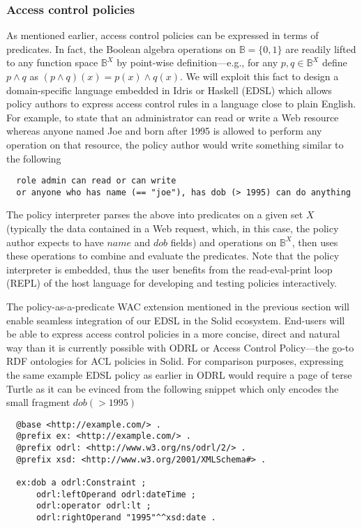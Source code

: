 \subsubsection{Access control policies}
As mentioned earlier, access control policies can be expressed in
terms of predicates. In fact, the Boolean algebra operations on
$\mathbb{B} = \{0,1\}$ are readily lifted to any function space
$\mathbb{B}^X$ by point-wise definition---e.g., for any $p,q \in \mathbb{B}^X$
define $p \wedge q$ as $(p \wedge q)(x) = p(x) \wedge q(x)$. We will
exploit this fact to design a domain-specific language embedded in
Idris or Haskell (EDSL\cite{gibbons2014folding}) which allows policy
authors to express access control rules in a language close to plain
English. For example, to state that an administrator can read or write
a Web resource whereas anyone named Joe and born after 1995 is allowed
to perform any operation on that resource, the policy author would
write something similar to the following
\begin{lstlisting}
  role admin can read or can write
  or anyone who has name (== "joe"), has dob (> 1995) can do anything
\end{lstlisting}
The policy interpreter parses the above into predicates on a given
set $X$ (typically the data contained in a Web request, which, in
this case, the policy author expects to have $name$ and $dob$ fields)
and operations on $\mathbb{B}^X$, then uses these operations to combine
and evaluate the predicates. Note that the policy interpreter is
embedded, thus the user benefits from the read-eval-print loop
(REPL) of the host language for developing and testing policies
interactively.

The policy-as-a-predicate WAC extension mentioned in the previous
section will enable seamless integration of our EDSL in the Solid
ecosystem. End-users will be able to express access control policies
in a more concise, direct and natural way than it is currently possible
with ODRL or Access Control Policy---the go-to RDF ontologies for
ACL policies in Solid. For comparison purposes, expressing the same
example EDSL policy as earlier in ODRL would require a page of terse
Turtle as it can be evinced from the following snippet which only
encodes the small fragment $dob (> 1995)$
\begin{lstlisting}
  @base <http://example.com/> .
  @prefix ex: <http://example.com/> .
  @prefix odrl: <http://www.w3.org/ns/odrl/2/> .
  @prefix xsd: <http://www.w3.org/2001/XMLSchema#> .

  ex:dob a odrl:Constraint ;
      odrl:leftOperand odrl:dateTime ;
      odrl:operator odrl:lt ;
      odrl:rightOperand "1995"^^xsd:date .
\end{lstlisting}


